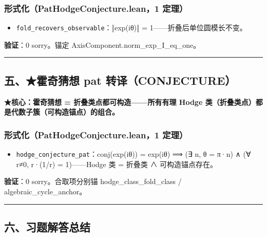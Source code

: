 \documentclass[
]{article}
\providecommand{\tightlist}{%
 \setlength{\itemsep}{0pt}\setlength{\parskip}{0pt}}
\begin{document}
\subsubsection{形式化（PatHodgeConjecture.lean，1
定理）}\label{ux5f62ux5f0fux5316pathodgeconjecture.lean1-ux5b9aux7406-3}

\begin{itemize}
\tightlist
\item
 \texttt{fold\_recovers\_observable}：‖exp(iθ)‖ =
 1------折叠后单位圆模长不变。
\end{itemize}

\textbf{验证}：0 sorry。锚定 AxisComponent.norm\_exp\_I\_eq\_one。

\begin{center}\rule{0.5\linewidth}{0.5pt}\end{center}

\subsection{五、★霍奇猜想 pat
转译（CONJECTURE）}\label{ux4e94ux970dux5947ux731cux60f3-pat-ux8f6cux8bd1conjecture}

\textbf{★核心：霍奇猜想 = 折叠类点都可构造------所有有理 Hodge
类（折叠类点）都是代数子簇（可构造锚点）的组合。}

\subsubsection{形式化（PatHodgeConjecture.lean，1
定理）}\label{ux5f62ux5f0fux5316pathodgeconjecture.lean1-ux5b9aux7406-4}

\begin{itemize}
\tightlist
\item
 \texttt{hodge\_conjecture\_pat}：conj(exp(iθ)) = exp(iθ) ⟹ (∃ n, θ =
 π·n) ∧ (∀ r≠0, r·(1/r) = 1)------Hodge 类 = 折叠类 ∧ 可构造锚点存在。
\end{itemize}

\textbf{验证}：0 sorry。合取项分别锚 hodge\_class\_fold\_class /
algebraic\_cycle\_anchor。

\begin{center}\rule{0.5\linewidth}{0.5pt}\end{center}

\subsection{六、习题解答总结}\label{ux516dux4e60ux9898ux89e3ux7b54ux603bux7ed3}
\end{document}
